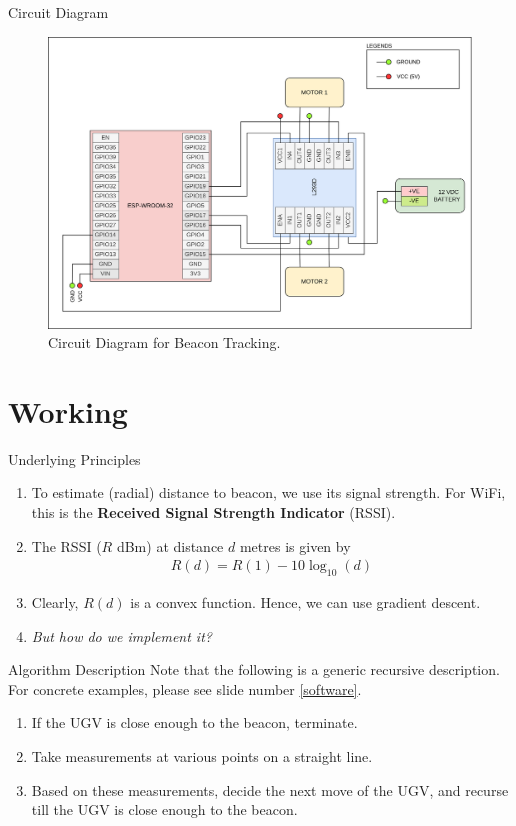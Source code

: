 \documentclass{beamer}
\providecommand{\brak}[1]{\ensuremath{\left(#1\right)}}
\theoremstyle{remark}
\begin{document}
\begin{frame}{Circuit Diagram}
    \begin{figure}[!ht]
        \centering
        \includegraphics[width=0.6\columnwidth]{figs/beacon.png}
        \caption{Circuit Diagram for Beacon Tracking.}
        \label{fig:ckt}
    \end{figure}
\end{frame}

\section{Working}
\begin{frame}{Underlying Principles}
    \begin{enumerate}
        \item To estimate (radial) distance to beacon, we use its signal strength.
            For WiFi, this is the \textbf{Received Signal Strength Indicator} (RSSI).
        \pause
        \item The RSSI ($R$ dBm) at distance $d$ metres is given by
        \begin{align}
            R(d) = R(1) - 10\log_{10}\brak{d}
        \end{align}
        \pause
        \item Clearly, $R(d)$ is a convex function. Hence, we can use gradient 
        descent.
        \pause
        \item \textit{But how do we implement it?}
    \end{enumerate}
\end{frame}

\begin{frame}{Algorithm Description}
    Note that the following is a generic recursive description. For concrete 
    examples, please see slide number \autoref{software}.
    \pause
    \begin{enumerate}
        \item If the UGV is close enough to the beacon, terminate.
        \pause
        \item Take measurements at various points on a straight line.
        \pause
        \item Based on these measurements, decide the next move of the UGV, and 
        recurse till the UGV is close enough to the beacon.
    \end{enumerate}
\end{frame}
\end{document}
